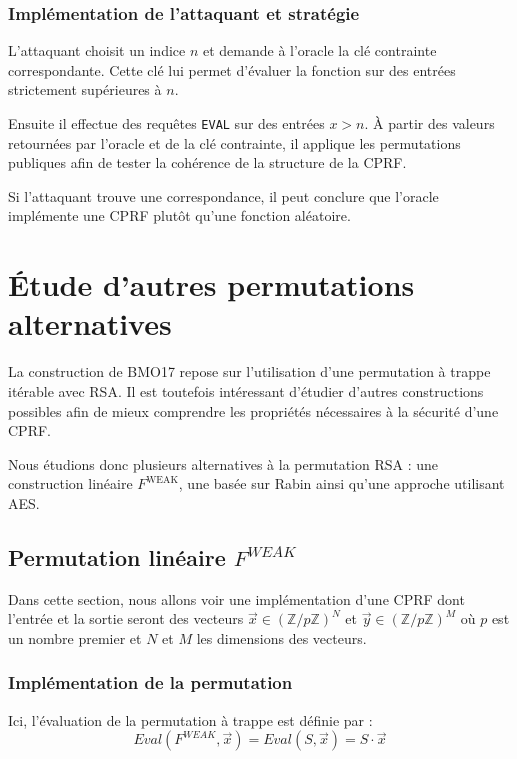 \documentclass[9pt]{extarticle}
\begin{document}
\subsubsection{Implémentation de l’attaquant et stratégie}

L’attaquant choisit un indice $n$ et demande à l’oracle la clé
contrainte correspondante. Cette clé lui permet d’évaluer la fonction sur des entrées
strictement supérieures à $n$.

Ensuite il effectue des requêtes \texttt{EVAL} sur des entrées
$x > n$. À partir des valeurs retournées par l’oracle et de la clé contrainte, il
applique les permutations publiques afin de tester la cohérence de la structure de la CPRF.

Si l’attaquant trouve une correspondance, il peut conclure que l’oracle implémente une CPRF plutôt qu’une fonction aléatoire.



\section{Étude d'autres permutations alternatives}

La construction de BMO17 repose sur l’utilisation d’une permutation à trappe
itérable avec RSA. Il est toutefois intéressant
d’étudier d’autres constructions possibles afin de mieux comprendre les propriétés
nécessaires à la sécurité d’une CPRF.

Nous étudions donc plusieurs alternatives à la permutation RSA :
une construction linéaire $F^{\text{WEAK}}$, une basée sur Rabin
ainsi qu’une approche utilisant AES.

\subsection{Permutation linéaire $F^{WEAK}$}

Dans cette section, nous allons voir une implémentation d'une CPRF dont l'entrée et la sortie seront des vecteurs $\vec{x} \in (\mathbb{Z}/p\mathbb{Z})^N $ et $\vec{y} \in (\mathbb{Z}/p\mathbb{Z})^M$ où $p$ est un nombre premier et $N$ et $M$ les dimensions des vecteurs.

\subsubsection{Implémentation de la permutation}
Ici, l'évaluation de la permutation à trappe est définie par :
\[Eval(F^{WEAK},\vec{x}) = Eval(S,\vec{x}) = S \cdot \vec{x}\] 
\end{document}
